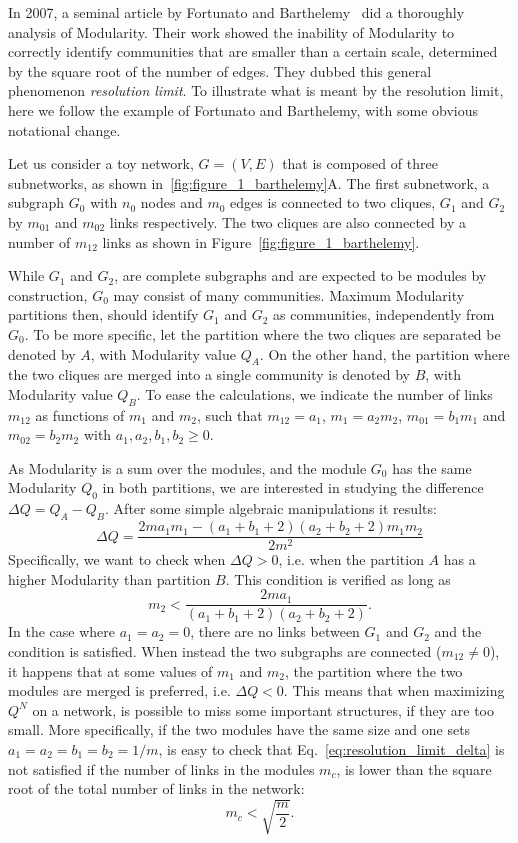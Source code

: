 In 2007, a seminal article by Fortunato and Barthelemy~\cite{fortunato2007} did a thoroughly analysis of Modularity.
Their work showed the inability of Modularity to correctly identify communities that are smaller than a certain scale, determined by the square root of the number of edges. They dubbed this general phenomenon \emph{resolution limit}.
To illustrate what is meant by the resolution limit, here we follow the example of Fortunato and Barthelemy, with some obvious notational change.

Let us consider a toy network, $G=(V,E)$ that is composed of three subnetworks, as shown in~\ref{fig:figure_1_barthelemy}A.
The first subnetwork, a subgraph $G_0$ with $n_0$ nodes and $m_0$ edges is connected to two cliques, $G_1$ and $G_2$ by $m_{01}$ and $m_{02}$ links respectively. The two cliques are also connected by a number of $m_{12}$ links as shown in Figure~\ref{fig:figure_1_barthelemy}.

While $G_1$ and $G_2$, are complete subgraphs and are expected to be modules by construction, $G_0$ may consist of many communities. Maximum Modularity partitions then, should identify $G_1$ and $G_2$ as communities, independently from $G_0$.
To be more specific, let the partition where the two cliques are separated be denoted by $A$, with Modularity value $Q_A$. On the other hand, the partition where the two cliques are merged into a single community is denoted by $B$, with Modularity value $Q_B$.
To ease the calculations, we indicate the number of links $m_{12}$ as functions of $m_1$ and $m_2$, such that $m_{12}=a_{1}$, $m_1=a_2 m_2$, $m_{01}=b_1 m_1$ and $m_{02}=b_2 m_2$ with $a_1,a_2,b_1,b_2 \geq 0$.

As Modularity is a sum over the modules, and the module $G_0$ has the same Modularity $Q_0$ in both partitions, we are interested in studying the difference $\Delta Q = Q_{A} - Q_{B}$. After some simple algebraic manipulations it results:
\begin{equation} \label{eq:resolution_limit_delta}
\Delta Q = \frac{2 m a_1 m_1 - (a_1+b_1+2)(a_2+b_2+2)m_1 m_2}{2m^2}
\end{equation}
Specifically, we want to check when $\Delta Q > 0$, i.e. when the partition $A$ has a higher Modularity than partition $B$. This condition is verified as long as
\begin{equation}
m_2 < \frac{2m a_1}{(a_1+b_1+2)(a_2+b_2+2)}.
\end{equation}
In the case where $a_1=a_2=0$, there are no links between $G_1$ and $G_2$ and the condition is satisfied. When instead the two subgraphs are connected ($m_{12} \neq 0$), it happens that at some values of $m_1$ and $m_2$, the partition where the two modules are merged is preferred, i.e. $\Delta Q <0$. This means that when maximizing $Q^N$ on a network, is possible to miss some important structures, if they are too small.
More specifically, if the two modules have the same size and one sets $a_1=a_2=b_1=b_2=1/m$, is easy to check that Eq.~\ref{eq:resolution_limit_delta} is not satisfied if the number of links in the modules $m_c$, is lower than the square root of the total number of links in the network:
\begin{equation}
m_c < \sqrt{\frac{m}{2}}.
\end{equation}

